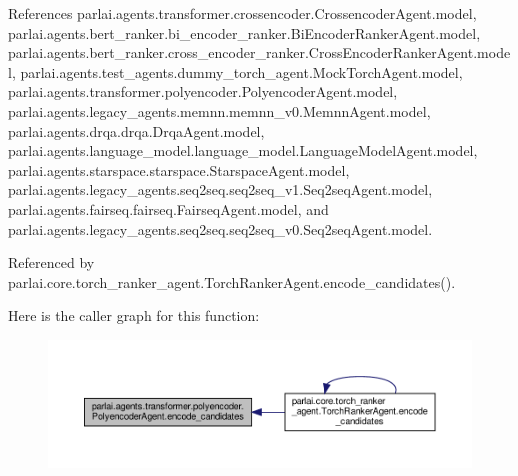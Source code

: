 References parlai.\+agents.\+transformer.\+crossencoder.\+Crossencoder\+Agent.\+model, parlai.\+agents.\+bert\+\_\+ranker.\+bi\+\_\+encoder\+\_\+ranker.\+Bi\+Encoder\+Ranker\+Agent.\+model, parlai.\+agents.\+bert\+\_\+ranker.\+cross\+\_\+encoder\+\_\+ranker.\+Cross\+Encoder\+Ranker\+Agent.\+model, parlai.\+agents.\+test\+\_\+agents.\+dummy\+\_\+torch\+\_\+agent.\+Mock\+Torch\+Agent.\+model, parlai.\+agents.\+transformer.\+polyencoder.\+Polyencoder\+Agent.\+model, parlai.\+agents.\+legacy\+\_\+agents.\+memnn.\+memnn\+\_\+v0.\+Memnn\+Agent.\+model, parlai.\+agents.\+drqa.\+drqa.\+Drqa\+Agent.\+model, parlai.\+agents.\+language\+\_\+model.\+language\+\_\+model.\+Language\+Model\+Agent.\+model, parlai.\+agents.\+starspace.\+starspace.\+Starspace\+Agent.\+model, parlai.\+agents.\+legacy\+\_\+agents.\+seq2seq.\+seq2seq\+\_\+v1.\+Seq2seq\+Agent.\+model, parlai.\+agents.\+fairseq.\+fairseq.\+Fairseq\+Agent.\+model, and parlai.\+agents.\+legacy\+\_\+agents.\+seq2seq.\+seq2seq\+\_\+v0.\+Seq2seq\+Agent.\+model.



Referenced by parlai.\+core.\+torch\+\_\+ranker\+\_\+agent.\+Torch\+Ranker\+Agent.\+encode\+\_\+candidates().

Here is the caller graph for this function\+:
\nopagebreak
\begin{figure}[H]
\begin{center}
\leavevmode
\includegraphics[width=350pt]{classparlai_1_1agents_1_1transformer_1_1polyencoder_1_1PolyencoderAgent_ae73fe8d98b46a7ef18ef7115f29c999d_icgraph}
\end{center}
\end{figure}
\mbox{\label{classparlai_1_1agents_1_1transformer_1_1polyencoder_1_1PolyencoderAgent_a4b6301664c0a7e98e9c688cc75ca79dc}} 

